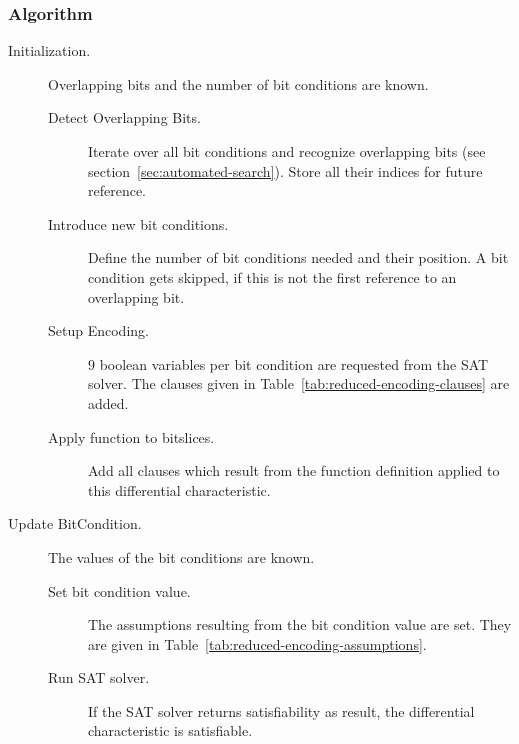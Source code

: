 \subsubsection{Algorithm}
\label{sec:reduced-encoding-algorithm}
%
\begin{description}
  \item[Initialization.] Overlapping bits and the number of bit conditions are known.
    \begin{description}
      \item[Detect Overlapping Bits.] Iterate over all bit conditions and recognize overlapping bits (see section~\ref{sec:automated-search}). Store all their indices for future reference.
      \item[Introduce new bit conditions.] Define the number of bit conditions needed and their position. A bit condition gets skipped, if this is not the first reference to an overlapping bit.
      \item[Setup Encoding.] $9$ boolean variables per bit condition are requested from the SAT solver. The clauses given in Table~\ref{tab:reduced-encoding-clauses} are added.
      \item[Apply function to bitslices.] Add all clauses which result from the function definition applied to this differential characteristic.
    \end{description}
  \item[Update BitCondition.] The values of the bit conditions are known.
    \begin{description}
      \item[Set bit condition value.] The assumptions resulting from the bit condition value are set. They are given in Table~\ref{tab:reduced-encoding-assumptions}.
      \item[Run SAT solver.] If the SAT solver returns satisfiability as result, the differential characteristic is satisfiable.
    \end{description}
\end{description}

